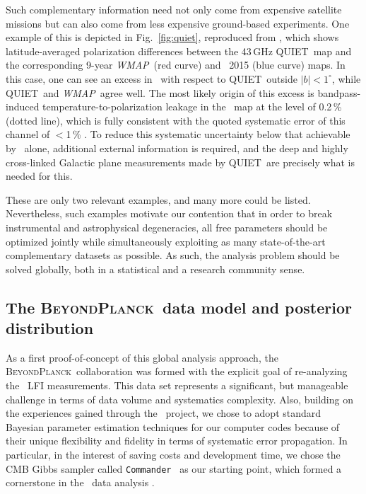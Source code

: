 \documentclass[twocolumn]{openjournal}
\def\WMAP{\textit{WMAP}}
\def\commander{\texttt{Commander}}
\newcommand{\BP}{\textsc{BeyondPlanck}}
\begin{document}
Such complementary information need not only come from expensive satellite
missions but can also come from less expensive ground-based experiments. One
example of this is depicted in Fig.~\ref{fig:quiet}, reproduced from
\citet{ruud:2015}, which shows latitude-averaged polarization differences
between the 43\,GHz QUIET\ map and the corresponding 9-year \WMAP\ (red curve)
and \Planck\ 2015 (blue curve) maps. In this case, one can see an excess in
\Planck\ with respect to QUIET\  outside $|b|<1^{\circ}$, while QUIET\ and
\WMAP\ agree well. The most likely origin of this excess is bandpass-induced
temperature-to-polarization leakage \citep{ruud:2015,bp09} in the \Planck\ map
at the level of 0.2\,\% (dotted line), which is fully consistent with the
quoted systematic error of this channel of $<$1\,\% \citep{planck2014-a04}. To
reduce this systematic uncertainty below that achievable by \Planck\ alone,
additional external information is required, and the deep and highly
cross-linked Galactic plane measurements made by QUIET\ are precisely what is
needed for this.

These are only two relevant examples, and many more could be listed.
Nevertheless, such examples motivate our contention that in order to break
instrumental and astrophysical degeneracies, all free parameters should be
optimized jointly while simultaneously exploiting as many state-of-the-art
complementary datasets as possible. As such, the analysis problem should be
solved globally, both in a statistical and a research community sense. 

\subsection{The \BP\ data model and posterior distribution}
\label{sec:posterior}

As a first proof-of-concept of this global analysis approach, the \BP\
collaboration \citep{bp01} was formed with the explicit goal of re-analyzing
the \Planck\ LFI measurements. This data set represents a significant, but
manageable challenge in terms of data volume and systematics complexity. Also,
building on the experiences gained through the \Planck\ project, we chose to
adopt standard Bayesian parameter estimation techniques for our computer codes
because of their unique flexibility and fidelity in terms of systematic error
propagation. In particular, in the interest of saving costs and development
time, we chose the CMB Gibbs sampler called \commander\
\citep{eriksen:2004,eriksen2008,seljebotn:2019} as our starting point, which
formed a cornerstone in the \Planck\ data analysis
\citep{planck2016-l04,planck2016-l05,planck2016-l06}.
\end{document}
